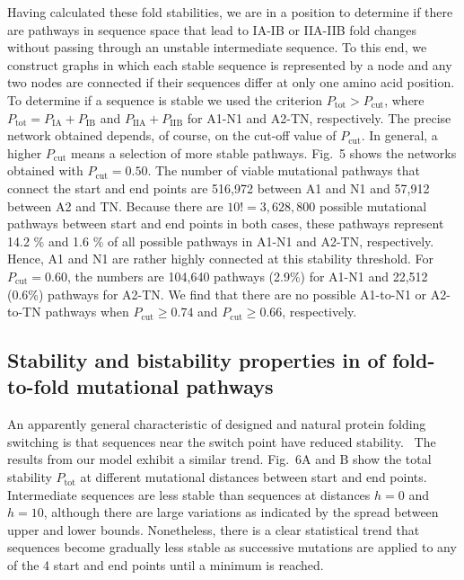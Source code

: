 \documentclass[
aip,
rsi,%
amsmath,amssymb,
reprint,%
]{revtex4-1}
\newcommand {\Pcut}     	{{P_\mathrm{cut}}}
\newcommand {\Ptot}	{{P_\mathrm{tot}}}
\newcommand {\PIA}    	{{P_\mathrm{IA}}}
\newcommand {\PIB}    	{{P_\mathrm{IB}}}
\newcommand {\PIIA}    	{{P_\mathrm{IIA}}}
\newcommand {\PIIB}    	{{P_\mathrm{IIB}}}
\begin{document}
Having calculated these fold stabilities, we are in a position to determine if there are pathways in sequence space that lead to IA-IB or IIA-IIB fold changes without passing through an unstable intermediate sequence. To this end, we construct graphs in which each stable sequence is represented by a node and any two nodes are connected if their sequences differ at only one amino acid position. To determine if a sequence is stable we used the criterion $P_\mathrm{tot}>\Pcut$, where  $\Ptot = \PIA + \PIB$ and $\PIIA + \PIIB$ for A1-N1 and A2-TN, respectively. The precise network obtained depends, of course, on the cut-off value of $\Pcut$. In general, a higher $\Pcut$ means a selection of more stable pathways. Fig.~5 shows the networks obtained with $\Pcut=0.50$. The number of viable mutational pathways that connect the start and end points are 516,972 between A1 and N1 and  57,912 between A2 and TN. Because there are $10! =3,628,800$ possible mutational pathways between start and end points in both cases, these pathways represent 14.2 \% and 1.6 \% of all possible pathways in A1-N1 and A2-TN, respectively. Hence, A1 and N1 are rather highly connected at this stability threshold. For $\Pcut=0.60$, the numbers are 104,640 pathways (2.9\%) for A1-N1 and 22,512 (0.6\%) pathways for A2-TN. We find that there are no possible A1-to-N1 or A2-to-TN pathways when $\Pcut\ge0.74$ and $\Pcut\ge 0.66$, respectively. \\

\subsection{Stability and bistability properties in of fold-to-fold mutational pathways}
\noindent 
An apparently general characteristic of designed and natural protein folding switching is that sequences near the switch point have reduced stability.~\cite{Bryan2010} The results from our model exhibit a similar trend. Fig.~6A and B show the total stability $\Ptot$ at different mutational distances between start and end points. Intermediate sequences are less stable than sequences at distances $h=0$ and $h=10$, although there are large variations as indicated by the spread between upper and lower bounds. Nonetheless, there is a clear statistical trend that sequences become gradually less stable as successive mutations are applied to any of the 4 start and end points until a minimum is reached. 
\end{document}
